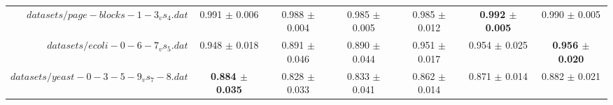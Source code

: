 \begin{table}[!ht]
{\begin{tabular}{r c c c c c c}
$datasets/page-blocks-1-3_vs_4.dat$ & 0.991 $\pm$ 0.006 & 0.988 $\pm$ 0.004 & 0.985 $\pm$ 0.005 & 0.985 $\pm$ 0.012 & \textbf{0.992 $\pm$ 0.005} & 0.990 $\pm$ 0.005 \\
$datasets/ecoli-0-6-7_vs_5.dat$ & 0.948 $\pm$ 0.018 & 0.891 $\pm$ 0.046 & 0.890 $\pm$ 0.044 & 0.951 $\pm$ 0.017 & 0.954 $\pm$ 0.025 & \textbf{0.956 $\pm$ 0.020} \\
$datasets/yeast-0-3-5-9_vs_7-8.dat$ & \textbf{0.884 $\pm$ 0.035} & 0.828 $\pm$ 0.033 & 0.833 $\pm$ 0.041 & 0.862 $\pm$ 0.014 & 0.871 $\pm$ 0.014 & 0.882 $\pm$ 0.021 \\
\end{tabular}}
\end{table}
